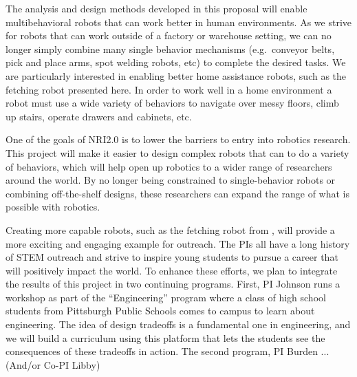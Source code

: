 \documentclass[11pt]{article}
\begin{document}

The analysis and design methods developed in this proposal will enable  multibehavioral robots that can work better in human environments. 
As we strive for robots that can work outside of a factory or warehouse setting, we can no longer simply combine many single behavior mechanisms (e.g.\ conveyor belts, pick and place arms, spot welding robots, etc) to complete the desired tasks. We are particularly interested in enabling better home assistance robots, such as the fetching robot presented here. In order to work well in a home environment a robot must use a wide variety of behaviors to navigate over messy floors, climb up stairs, operate drawers and cabinets, etc.

One of the goals of NRI2.0 is to lower the barriers to entry into robotics research. This project will make it easier to design complex robots that can to do a variety of behaviors, which will help open up robotics to a wider range of researchers around the world. By no longer being constrained to single-behavior robots or combining off-the-shelf designs, these researchers can expand the range of what is possible with robotics. 

Creating more capable robots, such as the fetching robot from , will provide a more exciting and engaging example for outreach. The PIs all have a long history of STEM outreach and strive to inspire young students to pursue a career that will positively impact the world. To enhance these efforts, we plan to integrate the results of this project in two continuing programs. First, PI Johnson runs a workshop as part of the ``Engineering\@CMU'' program where a class of high school students from Pittsburgh Public Schools comes to campus to learn about engineering. The idea of design tradeoffs is a fundamental one in engineering, and we will build a curriculum using this platform that lets the students see the consequences of these tradeoffs in action. The second program, PI Burden ... (And/or Co-PI Libby)
\end{document}
